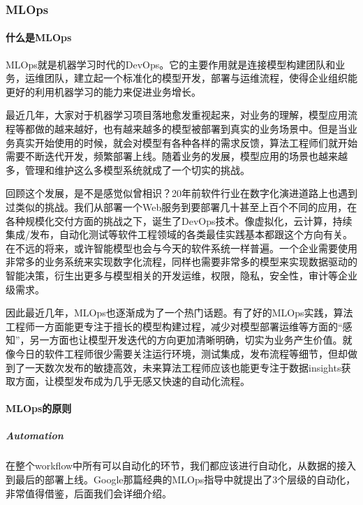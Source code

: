 \documentclass[letterpaper,10pt,english]{sphinxmanual}
\begin{document}
\subsubsection{MLOps}
\label{\detokenize{chapter_AI_dive/MLOps:mlops}}\label{\detokenize{chapter_AI_dive/MLOps::doc}}

\paragraph{什么是MLOps}
\label{\detokenize{chapter_AI_dive/MLOps:id1}}
MLOps就是机器学习时代的DevOps。它的主要作用就是连接模型构建团队和业务，运维团队，建立起一个标准化的模型开发，部署与运维流程，使得企业组织能更好的利用机器学习的能力来促进业务增长。

最近几年，大家对于机器学习项目落地愈发重视起来，对业务的理解，模型应用流程等都做的越来越好，也有越来越多的模型被部署到真实的业务场景中。但是当业务真实开始使用的时候，就会对模型有各种各样的需求反馈，算法工程师们就开始需要不断迭代开发，频繁部署上线。随着业务的发展，模型应用的场景也越来越多，管理和维护这么多模型系统就成了一个切实的挑战。

回顾这个发展，是不是感觉似曾相识？20年前软件行业在数字化演进道路上也遇到过类似的挑战。我们从部署一个Web服务到要部署几十甚至上百个不同的应用，在各种规模化交付方面的挑战之下，诞生了DevOps技术。像虚拟化，云计算，持续集成/发布，自动化测试等软件工程领域的各类最佳实践基本都跟这个方向有关。在不远的将来，或许智能模型也会与今天的软件系统一样普遍。一个企业需要使用非常多的业务系统来实现数字化流程，同样也需要非常多的模型来实现数据驱动的智能决策，衍生出更多与模型相关的开发运维，权限，隐私，安全性，审计等企业级需求。

因此最近几年，MLOps也逐渐成为了一个热门话题。有了好的MLOps实践，算法工程师一方面能更专注于擅长的模型构建过程，减少对模型部署运维等方面的“感知”，另一方面也让模型开发迭代的方向更加清晰明确，切实为业务产生价值。就像今日的软件工程师很少需要关注运行环境，测试集成，发布流程等细节，但却做到了一天数次发布的敏捷高效，未来算法工程师应该也能更专注于数据insights获取方面，让模型发布成为几乎无感又快速的自动化流程。


\paragraph{MLOps的原则}
\label{\detokenize{chapter_AI_dive/MLOps:id2}}

\subparagraph{Automation}
\label{\detokenize{chapter_AI_dive/MLOps:automation}}
在整个workflow中所有可以自动化的环节，我们都应该进行自动化，从数据的接入到最后的部署上线。Google那篇经典的MLOps指导中就提出了3个层级的自动化，非常值得借鉴，后面我们会详细介绍。
\end{document}
